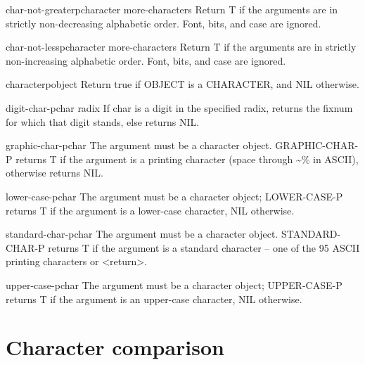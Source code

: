 \documentclass[10pt,english]{book}
\begin{document}
\begin{function}{char-not-greaterp}{character \rest more-characters}
  Return T if the arguments are in strictly non-decreasing alphabetic order.
   Font, bits, and case are ignored.
\end{function}

\begin{function}{char-not-lessp}{character \rest more-characters}
  Return T if the arguments are in strictly non-increasing alphabetic order.
   Font, bits, and case are ignored.
\end{function}

\begin{function}{characterp}{object}
  Return true if OBJECT is a CHARACTER, and NIL otherwise.
\end{function}

\begin{function}{digit-char-p}{char \op radix}
  If char is a digit in the specified radix, returns the fixnum for
  which that digit stands, else returns NIL.
\end{function}

\begin{function}{graphic-char-p}{char}
  The argument must be a character object. GRAPHIC-CHAR-P returns T if the
  argument is a printing character (space through \~{}\% in ASCII), otherwise
  returns NIL.
\end{function}

\begin{function}{lower-case-p}{char}
  The argument must be a character object; LOWER-CASE-P returns T if the
   argument is a lower-case character, NIL otherwise.
\end{function}

\begin{function}{standard-char-p}{char}
  The argument must be a character object. STANDARD-CHAR-P returns T if the
   argument is a standard character -- one of the 95 ASCII printing characters
   or <return>.
\end{function}

\begin{function}{upper-case-p}{char}
  The argument must be a character object; UPPER-CASE-P returns T if the
   argument is an upper-case character, NIL otherwise.
\end{function}

\section{Character comparison}
\label{sec:character-comparison}
\end{document}
